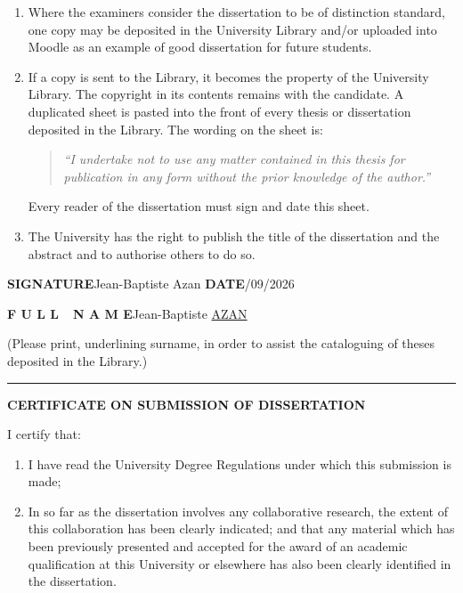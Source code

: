 \documentclass[12pt,a4paper]{report} %
\begin{document}
\begin{enumerate}
\item Where the examiners consider the dissertation to be of distinction standard, one copy
may be deposited in the University Library and/or uploaded into Moodle as an example of good
dissertation for future students.

\item If a copy is sent to the Library, it becomes the property of the University Library.
The copyright in its contents remains with the candidate. A duplicated sheet is pasted into
the front of every thesis or dissertation deposited in the Library. The wording on the sheet
is:

\begin{quote}
\emph{``I undertake not to use any matter contained in this thesis for publication in any
form without the prior knowledge of the author.''}
\end{quote}

Every reader of the dissertation must sign and date this sheet.

\item The University has the right to publish the title of the dissertation and the abstract
and to authorise others to do so.
\end{enumerate}

\vspace{0.6cm}
\noindent\textbf{SIGNATURE}\quad Jean-Baptiste Azan \hfill \textbf{DATE}/09/2026

\medskip
\noindent\textbf{F U L L\ \ N A M E}\quad Jean-Baptiste \underline{AZAN}

\noindent\footnotesize (Please print, underlining surname, in order to assist the
cataloguing of theses deposited in the Library.)\normalsize

\vspace{0.5cm}
\noindent\rule{\textwidth}{0.4pt}

\begin{center}
{\bfseries CERTIFICATE ON SUBMISSION OF DISSERTATION}
\end{center}

\noindent I certify that:

\begin{enumerate}
\item I have read the University Degree Regulations under which this submission is made;

\item In so far as the dissertation involves any collaborative research, the extent of this
collaboration has been clearly indicated; and that any material which has been previously
presented and accepted for the award of an academic qualification at this University or
elsewhere has also been clearly identified in the dissertation.
\end{enumerate}
\end{document}
